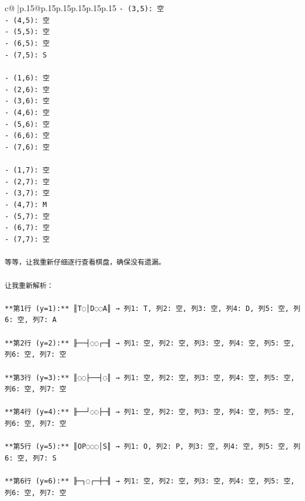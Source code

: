 \documentclass{article}
\begin{document}
{\begin{supertabular}{c@{$\;$}|p{.15\linewidth}@{}p{.15\linewidth}p{.15\linewidth}p{.15\linewidth}p{.15\linewidth}p{.15\linewidth}}
{{{\texttt{{-} (3,5): 空} \\
\texttt{{-} (4,5): 空} \\
\texttt{{-} (5,5): 空} \\
\texttt{{-} (6,5): 空} \\
\texttt{{-} (7,5): S} \\
\\ 
\texttt{{-} (1,6): 空} \\
\texttt{{-} (2,6): 空} \\
\texttt{{-} (3,6): 空} \\
\texttt{{-} (4,6): 空} \\
\texttt{{-} (5,6): 空} \\
\texttt{{-} (6,6): 空} \\
\texttt{{-} (7,6): 空} \\
\\ 
\texttt{{-} (1,7): 空} \\
\texttt{{-} (2,7): 空} \\
\texttt{{-} (3,7): 空} \\
\texttt{{-} (4,7): M} \\
\texttt{{-} (5,7): 空} \\
\texttt{{-} (6,7): 空} \\
\texttt{{-} (7,7): 空} \\
\\ 
\texttt{等等，让我重新仔细逐行查看棋盘，确保没有遗漏。} \\
\\ 
\texttt{让我重新解析：} \\
\\ 
\texttt{**第1行 (y=1):** ║T◌│D◌◌A║ → 列1: T, 列2: 空, 列3: 空, 列4: D, 列5: 空, 列6: 空, 列7: A} \\
\\ 
\texttt{**第2行 (y=2):** ╟──┤◌◌┌─╢ → 列1: 空, 列2: 空, 列3: 空, 列4: 空, 列5: 空, 列6: 空, 列7: 空} \\
\\ 
\texttt{**第3行 (y=3):** ║◌◌├──┤◌║ → 列1: 空, 列2: 空, 列3: 空, 列4: 空, 列5: 空, 列6: 空, 列7: 空} \\
\\ 
\texttt{**第4行 (y=4):** ╟──┘◌◌├─╢ → 列1: 空, 列2: 空, 列3: 空, 列4: 空, 列5: 空, 列6: 空, 列7: 空} \\
\\ 
\texttt{**第5行 (y=5):** ║OP◌◌◌│S║ → 列1: O, 列2: P, 列3: 空, 列4: 空, 列5: 空, 列6: 空, 列7: S} \\
\\ 
\texttt{**第6行 (y=6):** ╟─┐◌┌─┼─╢ → 列1: 空, 列2: 空, 列3: 空, 列4: 空, 列5: 空, 列6: 空, 列7: 空} \\
}}}
\end{supertabular}}
\end{document}
